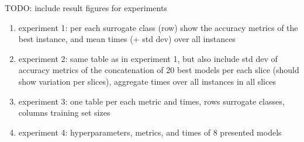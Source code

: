 TODO: include result figures for experiments

\begin{enumerate}
	\item experiment 1: per each surrogate class (row)
		show the accuracy metrics of the best instance, and mean times (+ std
		dev) over all instances
	\item experiment 2: same table as in experiment 1, but also include std dev
		of accuracy metrics of the concatenation of 20 best models per each
		slice (should show variation per slices), aggregate times over all
		instances in all slices
	\item experiment 3: one table per each metric and times, rows surrogate
		classes, columns training set sizes
	\item experiment 4: hyperparameters, metrics, and times of 8 presented models
\end{enumerate}
